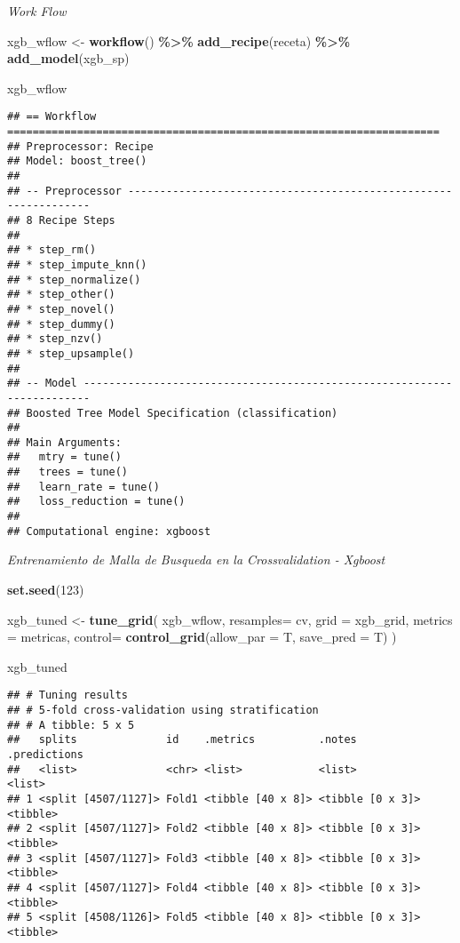 \documentclass[
]{article}
\newenvironment{Shaded}{\begin{snugshade}}{\end{snugshade}}
\newcommand{\AttributeTok}[1]{\textcolor[rgb]{0.13,0.29,0.53}{#1}}
\newcommand{\DecValTok}[1]{\textcolor[rgb]{0.00,0.00,0.81}{#1}}
\newcommand{\FunctionTok}[1]{\textcolor[rgb]{0.13,0.29,0.53}{\textbf{#1}}}
\newcommand{\NormalTok}[1]{#1}
\newcommand{\OtherTok}[1]{\textcolor[rgb]{0.56,0.35,0.01}{#1}}
\newcommand{\SpecialCharTok}[1]{\textcolor[rgb]{0.81,0.36,0.00}{\textbf{#1}}}
\begin{document}
\emph{Work Flow}

\begin{Shaded}
\begin{Highlighting}[]
\NormalTok{xgb\_wflow }\OtherTok{\textless{}{-}}
  \FunctionTok{workflow}\NormalTok{() }\SpecialCharTok{\%\textgreater{}\%}
  \FunctionTok{add\_recipe}\NormalTok{(receta) }\SpecialCharTok{\%\textgreater{}\%}
  \FunctionTok{add\_model}\NormalTok{(xgb\_sp)}

\NormalTok{xgb\_wflow}
\end{Highlighting}
\end{Shaded}

\begin{verbatim}
## == Workflow ====================================================================
## Preprocessor: Recipe
## Model: boost_tree()
## 
## -- Preprocessor ----------------------------------------------------------------
## 8 Recipe Steps
## 
## * step_rm()
## * step_impute_knn()
## * step_normalize()
## * step_other()
## * step_novel()
## * step_dummy()
## * step_nzv()
## * step_upsample()
## 
## -- Model -----------------------------------------------------------------------
## Boosted Tree Model Specification (classification)
## 
## Main Arguments:
##   mtry = tune()
##   trees = tune()
##   learn_rate = tune()
##   loss_reduction = tune()
## 
## Computational engine: xgboost
\end{verbatim}

\emph{Entrenamiento de Malla de Busqueda en la Crossvalidation -
Xgboost}

\begin{Shaded}
\begin{Highlighting}[]
\FunctionTok{set.seed}\NormalTok{(}\DecValTok{123}\NormalTok{)}

\NormalTok{xgb\_tuned }\OtherTok{\textless{}{-}} \FunctionTok{tune\_grid}\NormalTok{(}
\NormalTok{  xgb\_wflow,}
  \AttributeTok{resamples=}\NormalTok{ cv,}
  \AttributeTok{grid =}\NormalTok{ xgb\_grid,}
  \AttributeTok{metrics =}\NormalTok{ metricas,}
  \AttributeTok{control=} \FunctionTok{control\_grid}\NormalTok{(}\AttributeTok{allow\_par =}\NormalTok{ T, }\AttributeTok{save\_pred =}\NormalTok{ T)}
\NormalTok{  )}

\NormalTok{xgb\_tuned}
\end{Highlighting}
\end{Shaded}

\begin{verbatim}
## # Tuning results
## # 5-fold cross-validation using stratification 
## # A tibble: 5 x 5
##   splits              id    .metrics          .notes           .predictions
##   <list>              <chr> <list>            <list>           <list>      
## 1 <split [4507/1127]> Fold1 <tibble [40 x 8]> <tibble [0 x 3]> <tibble>    
## 2 <split [4507/1127]> Fold2 <tibble [40 x 8]> <tibble [0 x 3]> <tibble>    
## 3 <split [4507/1127]> Fold3 <tibble [40 x 8]> <tibble [0 x 3]> <tibble>    
## 4 <split [4507/1127]> Fold4 <tibble [40 x 8]> <tibble [0 x 3]> <tibble>    
## 5 <split [4508/1126]> Fold5 <tibble [40 x 8]> <tibble [0 x 3]> <tibble>
\end{verbatim}
\end{document}
